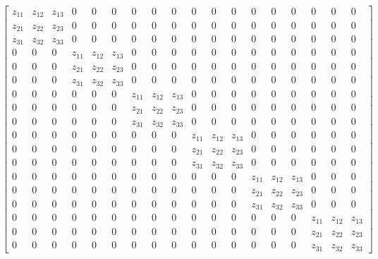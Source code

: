 \newpage
\begin{equation*}
\left[\begin{array}{cccccccccccccccccc}z_{11} & z_{12} & z_{13} & 0 & 0 & 0 & 0 & 0 & 0 & 0 & 0 & 0 & 0 & 0 & 0 & 0 & 0 & 0\\z_{21} & z_{22} & z_{23} & 0 & 0 & 0 & 0 & 0 & 0 & 0 & 0 & 0 & 0 & 0 & 0 & 0 & 0 & 0\\z_{31} & z_{32} & z_{33} & 0 & 0 & 0 & 0 & 0 & 0 & 0 & 0 & 0 & 0 & 0 & 0 & 0 & 0 & 0\\0 & 0 & 0 & z_{11} & z_{12} & z_{13} & 0 & 0 & 0 & 0 & 0 & 0 & 0 & 0 & 0 & 0 & 0 & 0\\0 & 0 & 0 & z_{21} & z_{22} & z_{23} & 0 & 0 & 0 & 0 & 0 & 0 & 0 & 0 & 0 & 0 & 0 & 0\\0 & 0 & 0 & z_{31} & z_{32} & z_{33} & 0 & 0 & 0 & 0 & 0 & 0 & 0 & 0 & 0 & 0 & 0 & 0\\0 & 0 & 0 & 0 & 0 & 0 & z_{11} & z_{12} & z_{13} & 0 & 0 & 0 & 0 & 0 & 0 & 0 & 0 & 0\\0 & 0 & 0 & 0 & 0 & 0 & z_{21} & z_{22} & z_{23} & 0 & 0 & 0 & 0 & 0 & 0 & 0 & 0 & 0\\0 & 0 & 0 & 0 & 0 & 0 & z_{31} & z_{32} & z_{33} & 0 & 0 & 0 & 0 & 0 & 0 & 0 & 0 & 0\\0 & 0 & 0 & 0 & 0 & 0 & 0 & 0 & 0 & z_{11} & z_{12} & z_{13} & 0 & 0 & 0 & 0 & 0 & 0\\0 & 0 & 0 & 0 & 0 & 0 & 0 & 0 & 0 & z_{21} & z_{22} & z_{23} & 0 & 0 & 0 & 0 & 0 & 0\\0 & 0 & 0 & 0 & 0 & 0 & 0 & 0 & 0 & z_{31} & z_{32} & z_{33} & 0 & 0 & 0 & 0 & 0 & 0\\0 & 0 & 0 & 0 & 0 & 0 & 0 & 0 & 0 & 0 & 0 & 0 & z_{11} & z_{12} & z_{13} & 0 & 0 & 0\\0 & 0 & 0 & 0 & 0 & 0 & 0 & 0 & 0 & 0 & 0 & 0 & z_{21} & z_{22} & z_{23} & 0 & 0 & 0\\0 & 0 & 0 & 0 & 0 & 0 & 0 & 0 & 0 & 0 & 0 & 0 & z_{31} & z_{32} & z_{33} & 0 & 0 & 0\\0 & 0 & 0 & 0 & 0 & 0 & 0 & 0 & 0 & 0 & 0 & 0 & 0 & 0 & 0 & z_{11} & z_{12} & z_{13}\\0 & 0 & 0 & 0 & 0 & 0 & 0 & 0 & 0 & 0 & 0 & 0 & 0 & 0 & 0 & z_{21} & z_{22} & z_{23}\\0 & 0 & 0 & 0 & 0 & 0 & 0 & 0 & 0 & 0 & 0 & 0 & 0 & 0 & 0 & z_{31} & z_{32} & z_{33}\end{array}\right]
\end{equation*}
